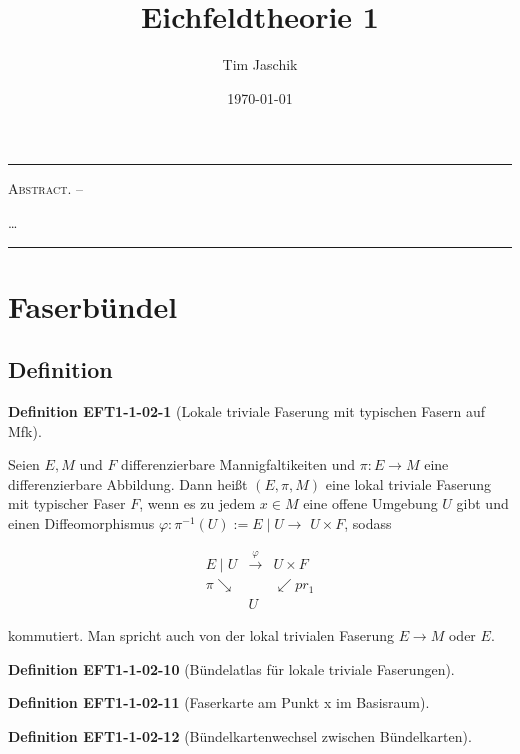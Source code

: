 \documentclass[10pt, letterpaper]{article}
\title{Eichfeldtheorie 1}
\author{Tim Jaschik}
\date{\today}
\renewenvironment{abstract}
  {
    \begin{adjustwidth}{1.5cm}{1.5cm}
    \small
    \textsc{Abstract. –}%
  }
  {
    \end{adjustwidth}
  }
\newcommand{\CustomHeading}[3]{%
  \par\medskip\noindent%
  \textbf{#1 #2} \textnormal{(#3)}.\enskip%
}
\newenvironment{DEF}[2]{\CustomHeading{Definition}{#1}{#2}}{}
\begin{document}
\maketitle
\rule{\textwidth}{0.5pt}
\begin{abstract}
…
\end{abstract}
\rule{\textwidth}{0.5pt}
\vspace{0.5cm}

\tableofcontents


\pagebreak


\section{Faserbündel}




\subsection{Definition}

\begin{DEF}{EFT1-1-02-1}{Lokale triviale Faserung mit typischen Fasern auf Mfk}
    Seien $E, M$ und $F$ differenzierbare Mannigfaltikeiten und $\pi: E \rightarrow M$ eine differenzierbare Abbildung. Dann heißt $(E, \pi, M)$ eine lokal triviale Faserung mit typischer Faser $F$, wenn es zu jedem $x \in M$ eine offene Umgebung $U$ gibt und einen Diffeomorphismus $\varphi: \pi^{-1}(U):=E \mid U \rightarrow$ $U \times F$, sodass

    $$
    \begin{array}{lll}
    E \mid U & \xrightarrow{\varphi} & U \times F \\
    \pi \searrow & & \swarrow p r_1 \\
    & U &
    \end{array}
    $$
    
    kommutiert. Man spricht auch von der lokal trivialen Faserung $E \rightarrow M$ oder $E$.
\end{DEF}

\begin{DEF}{EFT1-1-02-10}{Bündelatlas für lokale triviale Faserungen}

\end{DEF}

\begin{DEF}{EFT1-1-02-11}{Faserkarte am Punkt x im Basisraum}

\end{DEF}

\begin{DEF}{EFT1-1-02-12}{Bündelkartenwechsel zwischen Bündelkarten}

\end{DEF}
\end{document}
